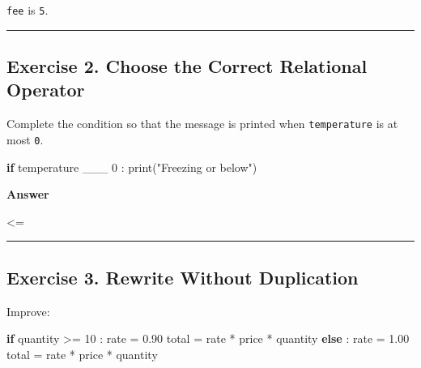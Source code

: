 \documentclass[
  11pt,
  a4paper,
]{article}
\newenvironment{Shaded}{}{}
\newcommand{\BuiltInTok}[1]{\textcolor[rgb]{0.00,0.50,0.00}{#1}}
\newcommand{\ControlFlowTok}[1]{\textcolor[rgb]{0.00,0.44,0.13}{\textbf{#1}}}
\newcommand{\DecValTok}[1]{\textcolor[rgb]{0.25,0.63,0.44}{#1}}
\newcommand{\FloatTok}[1]{\textcolor[rgb]{0.25,0.63,0.44}{#1}}
\newcommand{\NormalTok}[1]{#1}
\newcommand{\OperatorTok}[1]{\textcolor[rgb]{0.40,0.40,0.40}{#1}}
\newcommand{\StringTok}[1]{\textcolor[rgb]{0.25,0.44,0.63}{#1}}
\begin{document}
\texttt{fee} is \texttt{5}.

\begin{center}\rule{0.5\linewidth}{0.5pt}\end{center}

\subsection{Exercise 2. Choose the Correct Relational
Operator}\label{exercise-2.-choose-the-correct-relational-operator}

Complete the condition so that the message is printed when
\texttt{temperature} is at most \texttt{0}.

\begin{Shaded}
\begin{Highlighting}[]
\ControlFlowTok{if}\NormalTok{ temperature \_\_\_ }\DecValTok{0}\NormalTok{ :}
    \BuiltInTok{print}\NormalTok{(}\StringTok{"Freezing or below"}\NormalTok{)}
\end{Highlighting}
\end{Shaded}

\textbf{Answer}

\begin{Shaded}
\begin{Highlighting}[]
\OperatorTok{\textless{}=}
\end{Highlighting}
\end{Shaded}

\begin{center}\rule{0.5\linewidth}{0.5pt}\end{center}

\subsection{Exercise 3. Rewrite Without
Duplication}\label{exercise-3.-rewrite-without-duplication}

Improve:

\begin{Shaded}
\begin{Highlighting}[]
\ControlFlowTok{if}\NormalTok{ quantity }\OperatorTok{\textgreater{}=} \DecValTok{10}\NormalTok{ :}
\NormalTok{    rate }\OperatorTok{=} \FloatTok{0.90}
\NormalTok{    total }\OperatorTok{=}\NormalTok{ rate }\OperatorTok{*}\NormalTok{ price }\OperatorTok{*}\NormalTok{ quantity}
\ControlFlowTok{else}\NormalTok{ :}
\NormalTok{    rate }\OperatorTok{=} \FloatTok{1.00}
\NormalTok{    total }\OperatorTok{=}\NormalTok{ rate }\OperatorTok{*}\NormalTok{ price }\OperatorTok{*}\NormalTok{ quantity}
\end{Highlighting}
\end{Shaded}
\end{document}
